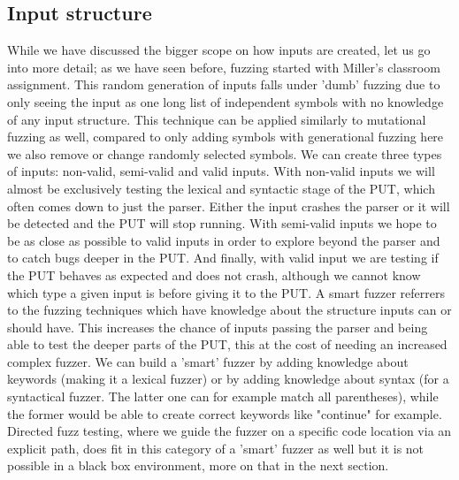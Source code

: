 \subsection{Input structure}
\label{fuzzing:InputStructure}
While we have discussed the bigger scope on how inputs are created, let us go into more detail; as we have seen before, fuzzing started with Miller's classroom assignment. This random generation of inputs falls under 'dumb' fuzzing due to only seeing the input as one long list of independent symbols with no knowledge of any input structure. This technique can be applied similarly to mutational fuzzing as well, compared to only adding symbols with generational fuzzing here we also remove or change randomly selected symbols. 
We can create three types of inputs: non-valid, semi-valid and valid inputs. With non-valid inputs we will almost be exclusively testing the lexical and syntactic stage of the PUT, which often comes down to just the parser. Either the input crashes the parser or it will be detected and the PUT will stop running. With semi-valid inputs we hope to be as close as possible to valid inputs in order to explore beyond the parser and to catch bugs deeper in the PUT. And finally, with valid input we are testing if the PUT behaves as expected and does not crash, although we cannot know which type a given input is before giving it to the PUT.
A smart fuzzer referrers to the fuzzing techniques which have knowledge about the structure inputs can or should have. This increases the chance of inputs passing the parser and being able to test the deeper parts of the PUT, this at the cost of needing an increased complex fuzzer. We can build a 'smart' fuzzer by adding knowledge about keywords (making it a lexical fuzzer) or by adding knowledge about syntax (for a syntactical fuzzer. The latter one can for example match all parentheses), while the former would be able to create correct keywords like "continue" for example. Directed fuzz testing, where we guide the fuzzer on a specific code location via an explicit path, does fit in this category of a 'smart' fuzzer as well but it is not possible in a black box environment, more on that in the next section.


